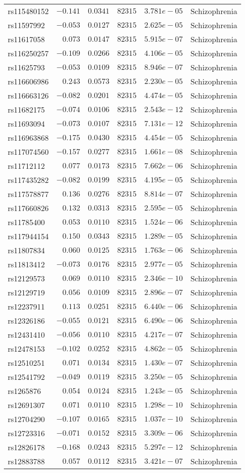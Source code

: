 \begin{tabular}{lrrrrl}
rs115480152&$-0.141$&$0.0341$&$ 82315$&$3.781e-05$&Schizophrenia\tabularnewline
rs11597992&$-0.053$&$0.0127$&$ 82315$&$2.625e-05$&Schizophrenia\tabularnewline
rs11617058&$ 0.073$&$0.0147$&$ 82315$&$5.915e-07$&Schizophrenia\tabularnewline
rs116250257&$-0.109$&$0.0266$&$ 82315$&$4.106e-05$&Schizophrenia\tabularnewline
rs11625793&$-0.053$&$0.0109$&$ 82315$&$8.946e-07$&Schizophrenia\tabularnewline
rs116606986&$ 0.243$&$0.0573$&$ 82315$&$2.230e-05$&Schizophrenia\tabularnewline
rs116663126&$-0.082$&$0.0201$&$ 82315$&$4.474e-05$&Schizophrenia\tabularnewline
rs11682175&$-0.074$&$0.0106$&$ 82315$&$2.543e-12$&Schizophrenia\tabularnewline
rs11693094&$-0.073$&$0.0107$&$ 82315$&$7.131e-12$&Schizophrenia\tabularnewline
rs116963868&$-0.175$&$0.0430$&$ 82315$&$4.454e-05$&Schizophrenia\tabularnewline
rs117074560&$-0.157$&$0.0277$&$ 82315$&$1.661e-08$&Schizophrenia\tabularnewline
rs11712112&$ 0.077$&$0.0173$&$ 82315$&$7.662e-06$&Schizophrenia\tabularnewline
rs117435282&$-0.082$&$0.0199$&$ 82315$&$4.195e-05$&Schizophrenia\tabularnewline
rs117578877&$ 0.136$&$0.0276$&$ 82315$&$8.814e-07$&Schizophrenia\tabularnewline
rs117660826&$ 0.132$&$0.0313$&$ 82315$&$2.595e-05$&Schizophrenia\tabularnewline
rs11785400&$ 0.053$&$0.0110$&$ 82315$&$1.524e-06$&Schizophrenia\tabularnewline
rs117944154&$ 0.150$&$0.0343$&$ 82315$&$1.289e-05$&Schizophrenia\tabularnewline
rs11807834&$ 0.060$&$0.0125$&$ 82315$&$1.763e-06$&Schizophrenia\tabularnewline
rs11813412&$-0.073$&$0.0176$&$ 82315$&$2.977e-05$&Schizophrenia\tabularnewline
rs12129573&$ 0.069$&$0.0110$&$ 82315$&$2.346e-10$&Schizophrenia\tabularnewline
rs12129719&$ 0.056$&$0.0109$&$ 82315$&$2.896e-07$&Schizophrenia\tabularnewline
rs12237911&$ 0.113$&$0.0251$&$ 82315$&$6.440e-06$&Schizophrenia\tabularnewline
rs12326186&$-0.055$&$0.0121$&$ 82315$&$6.490e-06$&Schizophrenia\tabularnewline
rs12431410&$-0.056$&$0.0110$&$ 82315$&$4.217e-07$&Schizophrenia\tabularnewline
rs12478153&$-0.102$&$0.0252$&$ 82315$&$4.862e-05$&Schizophrenia\tabularnewline
rs12510251&$ 0.071$&$0.0134$&$ 82315$&$1.430e-07$&Schizophrenia\tabularnewline
rs12541792&$-0.049$&$0.0119$&$ 82315$&$3.250e-05$&Schizophrenia\tabularnewline
rs1265876&$ 0.054$&$0.0124$&$ 82315$&$1.243e-05$&Schizophrenia\tabularnewline
rs12691307&$ 0.071$&$0.0110$&$ 82315$&$1.298e-10$&Schizophrenia\tabularnewline
rs12704290&$-0.107$&$0.0165$&$ 82315$&$1.037e-10$&Schizophrenia\tabularnewline
rs12723316&$-0.071$&$0.0152$&$ 82315$&$3.309e-06$&Schizophrenia\tabularnewline
rs12826178&$-0.168$&$0.0243$&$ 82315$&$5.297e-12$&Schizophrenia\tabularnewline
rs12883788&$ 0.057$&$0.0112$&$ 82315$&$3.421e-07$&Schizophrenia\tabularnewline

\end{tabular}
